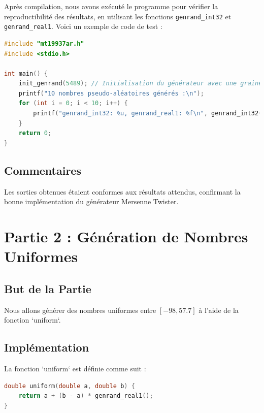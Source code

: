 \documentclass[a4paper,12pt]{report}
\begin{document}
Après compilation, nous avons exécuté le programme pour vérifier la reproductibilité des résultats, en utilisant les fonctions \texttt{genrand\_int32} et \texttt{genrand\_real1}. Voici un exemple de code de test :

\begin{lstlisting}[language=C]
#include "mt19937ar.h"
#include <stdio.h>

int main() {
    init_genrand(5489); // Initialisation du générateur avec une graine
    printf("10 nombres pseudo-aléatoires générés :\n");
    for (int i = 0; i < 10; i++) {
        printf("genrand_int32: %u, genrand_real1: %f\n", genrand_int32(), genrand_real1());
    }
    return 0;
}
\end{lstlisting}

\subsection*{Commentaires}
Les sorties obtenues étaient conformes aux résultats attendus, confirmant la bonne implémentation du générateur Mersenne Twister.

\newpage
\section*{Partie 2 : Génération de Nombres Uniformes}

\subsection*{But de la Partie}
Nous allons générer des nombres uniformes entre \([-98, 57.7]\) à l'aide de la fonction `uniform`.

\subsection*{Implémentation}
La fonction `uniform` est définie comme suit :

\begin{lstlisting}[language=C]
double uniform(double a, double b) {
    return a + (b - a) * genrand_real1();
}
\end{lstlisting}
\end{document}
